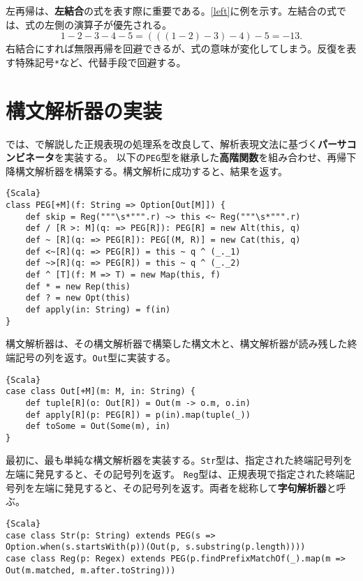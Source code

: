 \documentclass[10pt,a4paper]{book}
\begin{document}
左再帰は、\textbf{左結合}の式を表す際に重要である。\eqref{left}に例を示す。左結合の式では、式の左側の演算子が優先される。
%
\begin{equation}
\label{eq:left}
1 - 2 - 3 - 4 - 5 = (((1 - 2) - 3) - 4) - 5 = -13.
\end{equation}
%
右結合にすれば無限再帰を回避できるが、式の意味が変化してしまう。反復を表す特殊記号\texttt{*}など、代替手段で回避する。

\section{構文解析器の実装\label{sect:parsec}}

では、で解説した正規表現の処理系を改良して、解析表現文法に基づく\textbf{パーサコンビネータ}を実装する。
以下の\texttt{PEG}型を継承した\textbf{高階関数}を組み合わせ、再帰下降構文解析器を構築する。構文解析に成功すると、結果を返す。

\begin{Verbatim}{Scala}
class PEG[+M](f: String => Option[Out[M]]) {
	def skip = Reg("""\s*""".r) ~> this <~ Reg("""\s*""".r)
	def / [R >: M](q: => PEG[R]): PEG[R] = new Alt(this, q)
	def ~ [R](q: => PEG[R]): PEG[(M, R)] = new Cat(this, q)
	def <~[R](q: => PEG[R]) = this ~ q ^ (_._1)
	def ~>[R](q: => PEG[R]) = this ~ q ^ (_._2)
	def ^ [T](f: M => T) = new Map(this, f)
	def * = new Rep(this)
	def ? = new Opt(this)
	def apply(in: String) = f(in)
}
\end{Verbatim}

構文解析器は、その構文解析器で構築した構文木と、構文解析器が読み残した終端記号の列を返す。\texttt{Out}型に実装する。

\begin{Verbatim}{Scala}
case class Out[+M](m: M, in: String) {
	def tuple[R](o: Out[R]) = Out(m -> o.m, o.in)
	def apply[R](p: PEG[R]) = p(in).map(tuple(_))
	def toSome = Out(Some(m), in)
}
\end{Verbatim}

最初に、最も単純な構文解析器を実装する。\texttt{Str}型は、指定された終端記号列を左端に発見すると、その記号列を返す。
\texttt{Reg}型は、正規表現で指定された終端記号列を左端に発見すると、その記号列を返す。両者を総称して\textbf{字句解析器}と呼ぶ。

\begin{Verbatim}{Scala}
case class Str(p: String) extends PEG(s => Option.when(s.startsWith(p))(Out(p, s.substring(p.length))))
case class Reg(p: Regex) extends PEG(p.findPrefixMatchOf(_).map(m => Out(m.matched, m.after.toString)))
\end{Verbatim}
\end{document}

